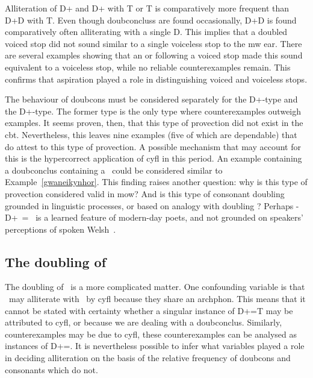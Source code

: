 Alliteration of \gls{D}+ and \gls{D}+  with \gls{T} or \gls{T} is comparatively more frequent than \gls{D}+\gls{D} with \gls{T}. Even though \gls{doubconclus}s are found occasionally, \gls{D}+\gls{D} is found comparatively often alliterating with a single \gls{D}. This implies that a doubled voiced stop did not sound similar to a single voiceless stop to the \gls{mw} ear. There are several examples showing that  an  or  following a voiced stop made this sound equivalent to a voiceless stop, while no reliable counterexamples remain. This confirms  that aspiration played a role in distinguishing voiced and voiceless stops. 

The behaviour of \gls{doubcon}s must be considered separately for the \gls{D}+\xD-type and the \gls{D}+\lT-type. The former type is the only type where counterexamples outweigh examples. It seems proven, then, that this type of provection did not exist in the \gls{cbt}. Nevertheless, this leaves nine examples (five of which are dependable) that do attest to this type of provection. A possible mechanism that may account for this is the hypercorrect application of \gls{cyfl} in this period. An example containing a \gls{doubconclus} containing a \xD\ could be considered similar to Example~\ref{gwaneikynhor}. This finding raises another question: why is this type of provection considered valid in \gls{mow}?  And is this type of consonant doubling grounded in linguistic processes, or based on analogy with doubling \lT? Perhaps -\gls{D}+\xD\ = \xT\ is a learned feature of modern-day poets, and  not  grounded on speakers' perceptions of spoken Welsh~\autocite{jones_y_2015}.

\subsection{The doubling of {\lT}}
\label{sec:doubling-lt}
The doubling of \lT\ is a more complicated matter. One confounding variable is that \lT\ may alliterate with \xT\ by \gls{cyfl} because they share an \gls{archphon}. This means that it cannot be stated with certainty whether a singular instance of \gls{D}+\lT=\gls{T} may be attributed to \gls{cyfl}, or because we are dealing with a \gls{doubconclus}. Similarly, counterexamples may be due to \gls{cyfl}, these counterexamples can be analysed as instances of \gls{D}+\lT=\lT. It is nevertheless possible to infer what variables played a role in deciding alliteration on the basis of the relative frequency of \gls{doubcon}s and consonants which do not. 

